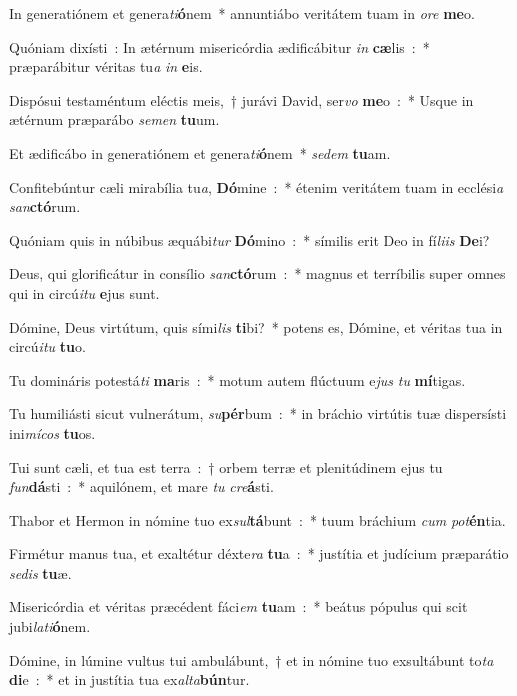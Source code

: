 \item In generatiónem et genera\emph{ti}\textbf{ó}nem~* annuntiábo veritátem tuam in \emph{o}\emph{re} \textbf{me}o.
\item Quóniam dixísti~: In ætérnum misericórdia ædificábitur \emph{in} \textbf{cæ}lis~:~* præparábitur véritas tu\emph{a} \emph{in} \textbf{e}is.
\item Dispósui testaméntum eléctis meis,~† jurávi David, ser\emph{vo} \textbf{me}o~:~* Usque in ætérnum præparábo \emph{se}\emph{men} \textbf{tu}um.
\item Et ædificábo in generatiónem et genera\emph{ti}\textbf{ó}nem~* \emph{se}\emph{dem} \textbf{tu}am.
\item Confitebúntur cæli mirabília tu\emph{a}, \textbf{Dó}mine~:~* étenim veritátem tuam in ecclési\emph{a} \emph{san}\textbf{ctó}rum.
\item Quóniam quis in núbibus æquábi\emph{tur} \textbf{Dó}mino~:~* símilis erit Deo in fí\emph{li}\emph{is} \textbf{De}i?
\item Deus, qui glorificátur in consílio \emph{san}\textbf{ctó}rum~:~* magnus et terríbilis super omnes qui in circú\emph{i}\emph{tu} \textbf{e}jus sunt.
\item Dómine, Deus virtútum, quis sími\emph{lis} \textbf{ti}bi?~* potens es, Dómine, et véritas tua in circú\emph{i}\emph{tu} \textbf{tu}o.
\item Tu domináris potestá\emph{ti} \textbf{ma}ris~:~* motum autem flúctuum e\emph{jus} \emph{tu} \textbf{mí}tigas.
\item Tu humiliásti sicut vulnerátum, \emph{su}\textbf{pér}bum~:~* in bráchio virtútis tuæ dispersísti ini\emph{mí}\emph{cos} \textbf{tu}os.
\item Tui sunt cæli, et tua est terra~:~† orbem terræ et plenitúdinem ejus tu \emph{fun}\textbf{dá}sti~:~* aquilónem, et mare \emph{tu} \emph{cre}\textbf{á}sti.
\item Thabor et Hermon in nómine tuo ex\emph{sul}\textbf{tá}bunt~:~* tuum bráchium \emph{cum} \emph{pot}\textbf{én}tia.
\item Firmétur manus tua, et exaltétur déxte\emph{ra} \textbf{tu}a~:~* justítia et judícium præparátio \emph{se}\emph{dis} \textbf{tu}æ.
\item Misericórdia et véritas præcédent fáci\emph{em} \textbf{tu}am~:~* beátus pópulus qui scit jubi\emph{la}\emph{ti}\textbf{ó}nem.
\item Dómine, in lúmine vultus tui ambulábunt,~† et in nómine tuo exsultábunt to\emph{ta} \textbf{di}e~:~* et in justítia tua ex\emph{al}\emph{ta}\textbf{bún}tur.
